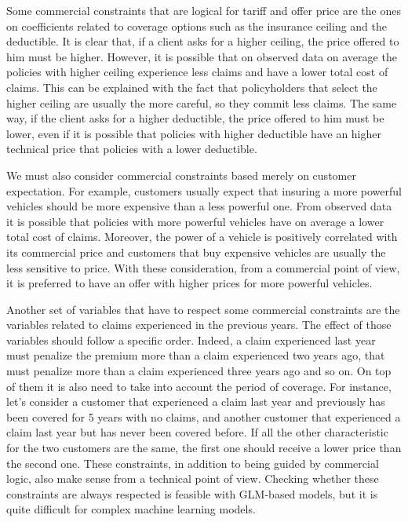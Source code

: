 \documentclass[a4paper, twoside, openright, 12pt]{report}
\theoremstyle{definition}
\theoremstyle{definition}
\theoremstyle{definition}
\theoremstyle{remark}
\begin{document}
Some commercial constraints that are logical for tariff and offer price are the ones on coefficients related to coverage options such as the insurance ceiling and the deductible. It is clear that, if a client asks for a higher ceiling, the price offered to him must be higher. However, it is possible that on observed data on average the policies with higher ceiling experience less claims and have a lower total cost of claims. This can be explained with the fact that policyholders that select the higher ceiling are usually the more careful, so they commit less claims. The same way, if the client asks for a higher deductible, the price offered to him must be lower, even if it is possible that policies with higher deductible have an higher technical price that policies with a lower deductible.

We must also consider commercial constraints based merely on customer expectation. For example, customers usually expect that insuring a more powerful vehicles should be more expensive than a less powerful one. From observed data it is possible that policies with more powerful vehicles have on average a lower total cost of claims. Moreover, the power of a vehicle is positively correlated with its commercial price and customers that buy expensive vehicles are usually the less sensitive to price. With these consideration, from a commercial point of view, it is preferred to have an offer with higher prices for more powerful vehicles.

Another set of variables that have to respect some commercial constraints are the variables related to claims experienced in the previous years. The effect of those variables should follow a specific order. Indeed, a claim experienced last year must penalize the premium more than a claim experienced two years ago, that must penalize more than a claim experienced three years ago and so on. On top of them it is also need to take into account the period of coverage. For instance, let's consider a customer that experienced a claim last year and previously has been covered for 5 years with no claims, and another customer that experienced a claim last year but has never been covered before. If all the other characteristic for the two customers are the same, the first one should receive a lower price than the second one. These constraints, in addition to being guided by commercial logic, also make sense from a technical point of view. Checking whether these constraints are always respected is feasible with GLM-based models, but it is quite difficult for complex machine learning models.
\end{document}
